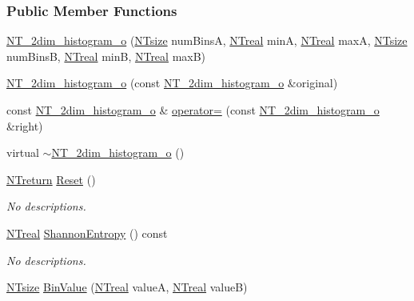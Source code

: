 \subsubsection*{Public Member Functions}
\begin{DoxyCompactItemize}
\item 
\hyperlink{class_n_t__2dim__histogram__o_aa180c7883d8dc15e6722ad5e62167dfb}{NT\_\-2dim\_\-histogram\_\-o} (\hyperlink{nt__types_8h_a06c124f2e4469769b58230253ce0560b}{NTsize} numBinsA, \hyperlink{nt__types_8h_a814a97893e9deb1eedcc7604529ba80d}{NTreal} minA, \hyperlink{nt__types_8h_a814a97893e9deb1eedcc7604529ba80d}{NTreal} maxA, \hyperlink{nt__types_8h_a06c124f2e4469769b58230253ce0560b}{NTsize} numBinsB, \hyperlink{nt__types_8h_a814a97893e9deb1eedcc7604529ba80d}{NTreal} minB, \hyperlink{nt__types_8h_a814a97893e9deb1eedcc7604529ba80d}{NTreal} maxB)
\item 
\hyperlink{class_n_t__2dim__histogram__o_a532e789b5e392e06ffcc03658ae0e555}{NT\_\-2dim\_\-histogram\_\-o} (const \hyperlink{class_n_t__2dim__histogram__o}{NT\_\-2dim\_\-histogram\_\-o} \&original)
\item 
const \hyperlink{class_n_t__2dim__histogram__o}{NT\_\-2dim\_\-histogram\_\-o} \& \hyperlink{class_n_t__2dim__histogram__o_af6d92782747ed508260a513253161756}{operator=} (const \hyperlink{class_n_t__2dim__histogram__o}{NT\_\-2dim\_\-histogram\_\-o} \&right)
\item 
virtual \hyperlink{class_n_t__2dim__histogram__o_a29af2f7a33943f70ac04cc5ffb637bc2}{$\sim$NT\_\-2dim\_\-histogram\_\-o} ()
\item 
\hyperlink{nt__types_8h_ab9564ee8f091e809d21b8451c6683c53}{NTreturn} \hyperlink{class_n_t__2dim__histogram__o_ab4322a1be3d79fd65139f05dd0a62dfd}{Reset} ()
\begin{DoxyCompactList}\small\item\em No descriptions. \item\end{DoxyCompactList}\item 
\hyperlink{nt__types_8h_a814a97893e9deb1eedcc7604529ba80d}{NTreal} \hyperlink{class_n_t__2dim__histogram__o_a69673e305079d50cddfe1df5b4c770b9}{ShannonEntropy} () const 
\begin{DoxyCompactList}\small\item\em No descriptions. \item\end{DoxyCompactList}\item 
\hyperlink{nt__types_8h_a06c124f2e4469769b58230253ce0560b}{NTsize} \hyperlink{class_n_t__2dim__histogram__o_a09d3abcd42d137ae2cf28af185a3a7c5}{BinValue} (\hyperlink{nt__types_8h_a814a97893e9deb1eedcc7604529ba80d}{NTreal} valueA, \hyperlink{nt__types_8h_a814a97893e9deb1eedcc7604529ba80d}{NTreal} valueB)

\end{DoxyCompactItemize}
